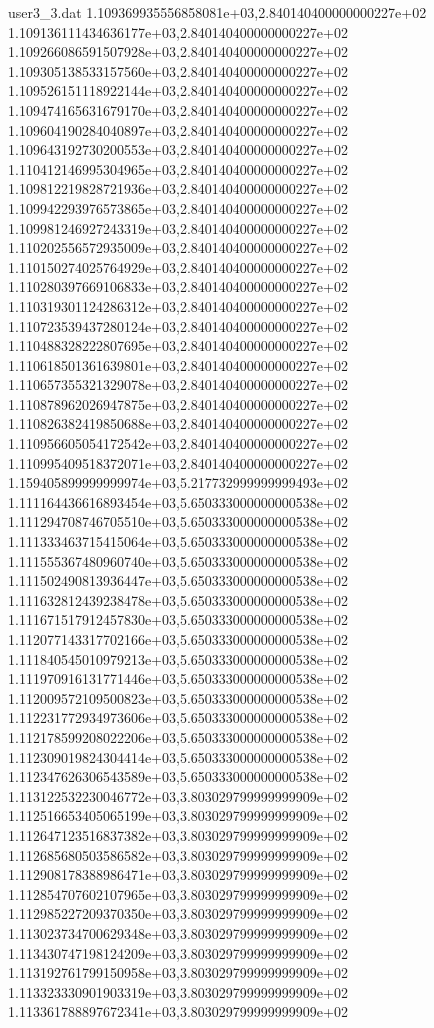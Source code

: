 \begin{filecontents}{user3_3.dat}
1.109369935556858081e+03,2.840140400000000227e+02
1.109136111434636177e+03,2.840140400000000227e+02
1.109266086591507928e+03,2.840140400000000227e+02
1.109305138533157560e+03,2.840140400000000227e+02
1.109526151118922144e+03,2.840140400000000227e+02
1.109474165631679170e+03,2.840140400000000227e+02
1.109604190284040897e+03,2.840140400000000227e+02
1.109643192730200553e+03,2.840140400000000227e+02
1.110412146995304965e+03,2.840140400000000227e+02
1.109812219828721936e+03,2.840140400000000227e+02
1.109942293976573865e+03,2.840140400000000227e+02
1.109981246927243319e+03,2.840140400000000227e+02
1.110202556572935009e+03,2.840140400000000227e+02
1.110150274025764929e+03,2.840140400000000227e+02
1.110280397669106833e+03,2.840140400000000227e+02
1.110319301124286312e+03,2.840140400000000227e+02
1.110723539437280124e+03,2.840140400000000227e+02
1.110488328222807695e+03,2.840140400000000227e+02
1.110618501361639801e+03,2.840140400000000227e+02
1.110657355321329078e+03,2.840140400000000227e+02
1.110878962026947875e+03,2.840140400000000227e+02
1.110826382419850688e+03,2.840140400000000227e+02
1.110956605054172542e+03,2.840140400000000227e+02
1.110995409518372071e+03,2.840140400000000227e+02
1.159405899999999974e+03,5.217732999999999493e+02
1.111164436616893454e+03,5.650333000000000538e+02
1.111294708746705510e+03,5.650333000000000538e+02
1.111333463715415064e+03,5.650333000000000538e+02
1.111555367480960740e+03,5.650333000000000538e+02
1.111502490813936447e+03,5.650333000000000538e+02
1.111632812439238478e+03,5.650333000000000538e+02
1.111671517912457830e+03,5.650333000000000538e+02
1.112077143317702166e+03,5.650333000000000538e+02
1.111840545010979213e+03,5.650333000000000538e+02
1.111970916131771446e+03,5.650333000000000538e+02
1.112009572109500823e+03,5.650333000000000538e+02
1.112231772934973606e+03,5.650333000000000538e+02
1.112178599208022206e+03,5.650333000000000538e+02
1.112309019824304414e+03,5.650333000000000538e+02
1.112347626306543589e+03,5.650333000000000538e+02
1.113122532230046772e+03,3.803029799999999909e+02
1.112516653405065199e+03,3.803029799999999909e+02
1.112647123516837382e+03,3.803029799999999909e+02
1.112685680503586582e+03,3.803029799999999909e+02
1.112908178388986471e+03,3.803029799999999909e+02
1.112854707602107965e+03,3.803029799999999909e+02
1.112985227209370350e+03,3.803029799999999909e+02
1.113023734700629348e+03,3.803029799999999909e+02
1.113430747198124209e+03,3.803029799999999909e+02
1.113192761799150958e+03,3.803029799999999909e+02
1.113323330901903319e+03,3.803029799999999909e+02
1.113361788897672341e+03,3.803029799999999909e+02

\end{filecontents}
